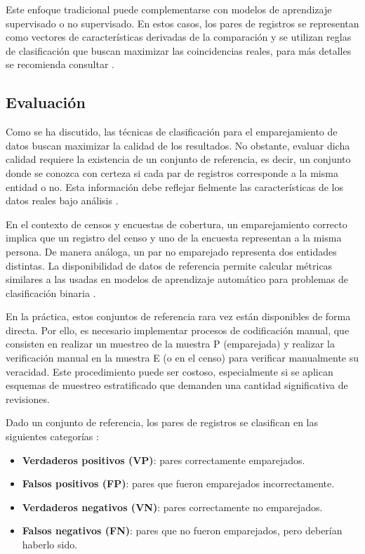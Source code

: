 \documentclass[
  12pt,
]{book}
\providecommand{\tightlist}{%
  \setlength{\itemsep}{0pt}\setlength{\parskip}{0pt}}
\begin{document}
Este enfoque tradicional puede complementarse con modelos de aprendizaje supervisado o no supervisado. En estos casos, los pares de registros se representan como vectores de características derivadas de la comparación y se utilizan reglas de clasificación que buscan maximizar las coincidencias reales, para más detalles se recomienda consultar \citep[Capítulo 6]{christen2012data}.

\subsection{Evaluación}\label{evaluaciuxf3n}

Como se ha discutido, las técnicas de clasificación para el emparejamiento de datos buscan maximizar la calidad de los resultados. No obstante, evaluar dicha calidad requiere la existencia de un conjunto de referencia, es decir, un conjunto donde se conozca con certeza si cada par de registros corresponde a la misma entidad o no. Esta información debe reflejar fielmente las características de los datos reales bajo análisis \citep{christen2012data}.

En el contexto de censos y encuestas de cobertura, un emparejamiento correcto implica que un registro del censo y uno de la encuesta representan a la misma persona. De manera análoga, un par no emparejado representa dos entidades distintas. La disponibilidad de datos de referencia permite calcular métricas similares a las usadas en modelos de aprendizaje automático para problemas de clasificación binaria \citep{menestrina2010evaluating}.

En la práctica, estos conjuntos de referencia rara vez están disponibles de forma directa. Por ello, es necesario implementar procesos de codificación manual, que consisten en realizar un muestreo de la muestra P (emparejada) y realizar la verificación manual en la muestra E (o en el censo) para verificar manualmente su veracidad. Este procedimiento puede ser costoso, especialmente si se aplican esquemas de muestreo estratificado que demanden una cantidad significativa de revisiones.

Dado un conjunto de referencia, los pares de registros se clasifican en las siguientes categorías \citep{christen2012data}:

\begin{itemize}
\tightlist
\item
  \textbf{Verdaderos positivos (VP)}: pares correctamente emparejados.\\
\item
  \textbf{Falsos positivos (FP)}: pares que fueron emparejados incorrectamente.\\
\item
  \textbf{Verdaderos negativos (VN)}: pares correctamente no emparejados.\\
\item
  \textbf{Falsos negativos (FN)}: pares que no fueron emparejados, pero deberían haberlo sido.
\end{itemize}
\end{document}
